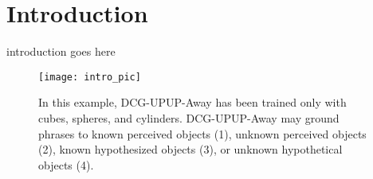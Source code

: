 \section{Introduction}
introduction goes here

\begin{figure}[t]
	\centering
	\texttt{[image: intro\_pic]}
	\caption{In this example, DCG-UPUP-Away has been trained only with cubes, spheres, and cylinders. DCG-UPUP-Away may ground phrases to known perceived objects (1), unknown perceived objects (2), known hypothesized objects (3), or unknown hypothetical objects (4).}
	\label{fig:intro_pic}
\end{figure}